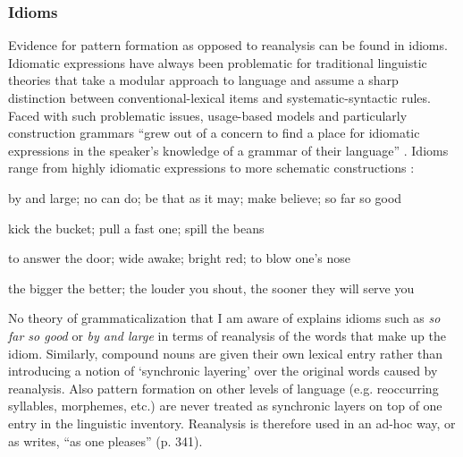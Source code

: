  

\subsubsection{Idioms}
 Evidence for pattern formation as opposed to reanalysis can be found in idioms. Idiomatic expressions have always been problematic for traditional linguistic theories that take a modular approach to language and assume a sharp distinction between conventional-lexical items and systematic-syntactic rules. Faced with such problematic issues, usage-based models and particularly construction grammars  ``grew out of a concern to find a place for idiomatic expressions in the speaker's knowledge of a grammar of their language''  \citep[225]{croft04cognitive}. Idioms range from highly idiomatic expressions to more schematic constructions \citep[][chapter 9]{croft04cognitive}:

\ea
by and large; no can do; be that as it may; make believe; so far so good
\item kick the bucket; pull a fast one; spill the beans
\item to answer the door; wide awake; bright red; to blow one's nose
\item the bigger the better; the louder you shout, the sooner they will serve you
\z

No theory of grammaticalization that I am aware of explains idioms such as {\em so far so good} or {\em by and large} in terms of reanalysis of the words that make up the idiom. Similarly, compound nouns are given their own lexical entry rather than introducing a notion of `synchronic layering' \citep[124--126]{hopper93grammaticalization} over the original words caused by reanalysis. Also pattern formation on other levels of language (e.g. reoccurring syllables, morphemes, etc.) are never treated as synchronic layers on top of one entry in the linguistic inventory. Reanalysis is therefore used in an ad-hoc way, or as \citet{haspelmath98does} writes,  ``as one pleases''  (p. 341).

